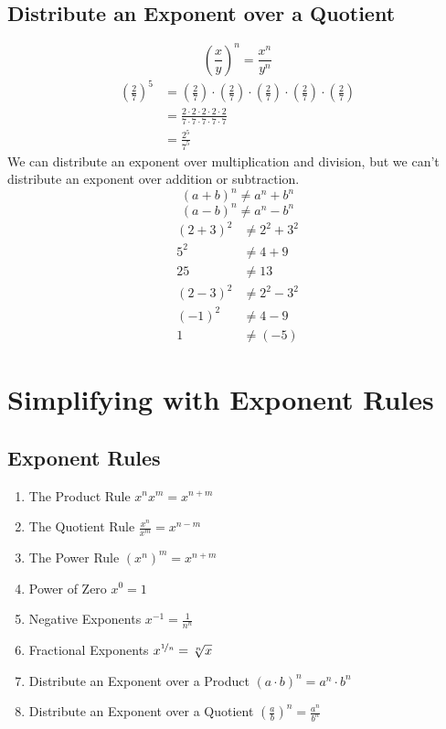 \documentclass{article}
\begin{document}
    \subsection{Distribute an Exponent over a Quotient}
    \begin{equation}
        \left( \frac{x}{y} \right) ^n = \frac{x^n}{y^n}
    \end{equation}
    \begin{align*}
        \left( \frac{2}{7} \right)^5 &= \left( \frac{2}{7} \right) \cdot \left( \frac{2}{7} \right) \cdot \left( \frac{2}{7} \right) \cdot \left( \frac{2}{7} \right) \cdot \left( \frac{2}{7} \right) \\
        &= \frac{2 \cdot 2 \cdot 2 \cdot 2 \cdot 2}{7 \cdot 7 \cdot 7 \cdot 7 \cdot 7} \\
        &= \frac{2^5}{7^5}
    \end{align*}
    We can distribute an exponent over multiplication and division, 
    but we can't distribute an exponent over addition or subtraction. \\
    \begin{equation*}
        (a + b)^n \neq a^n + b^n
    \end{equation*}
    \begin{equation*}
        (a - b)^n \neq a^n - b^n
    \end{equation*}
    \begin{align*}
        (2+3)^2 &\neq 2^2 + 3^2 \\
        5^2 &\neq 4 + 9 \\
        25 &\neq 13
    \end{align*}
    \begin{align*}
        (2-3)^2 &\neq 2^2 - 3^2 \\
        (-1)^2 &\neq 4 - 9 \\
        1 &\neq (-5)
    \end{align*}
    
    \section{Simplifying with Exponent Rules}
    \subsection{Exponent Rules}
    \begin{enumerate}
        \item The Product Rule $x^n x^m =x^{n+m}$
        \item The Quotient Rule $\frac{x^n}{x^m} = x^{n-m}$
        \item The Power Rule $(x^n)^m = x^{n+m}$
        \item Power of Zero $x^0 = 1$
        \item Negative Exponents $x^{-1} = \frac{1}{n^n}$
        \item Fractional Exponents $x^{\nicefrac{1}{n}} = \sqrt[n]{x}$
        \item Distribute an Exponent over a Product $(a \cdot b)^n = a^n \cdot b^n$
        \item Distribute an Exponent over a Quotient $\left( \frac{a}{b} \right)^n = \frac{a^n}{b^n}$
    \end{enumerate}
\end{document}
